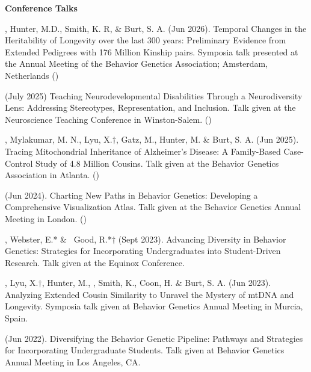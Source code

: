 {\large {\bf Conference Talks}}\begin{etaremune}

\item \meb, Hunter, M.D., Smith, K. R, \& Burt, S. A. (Jun 2026). Temporal Changes in the Heritability of Longevity over the last 300 years: Preliminary Evidence from Extended Pedigrees with 176 Million Kinship pairs. Symposia talk presented at the Annual Meeting of the Behavior Genetics Association; Amsterdam, Netherlands ()

\item \meb (July 2025) Teaching Neurodevelopmental Disabilities Through a Neurodiversity Lens: Addressing Stereotypes, Representation, and Inclusion.  Talk given at the Neuroscience Teaching Conference in Winston-Salem. ()

\item \meb, Mylakumar, M. N., Lyu, X.$\dagger$, Gatz, M., Hunter, M. \& Burt, S. A. (Jun 2025). Tracing Mitochondrial Inheritance of Alzheimer's Disease: A Family-Based Case-Control Study of 4.8 Million Cousins. Talk given at the Behavior Genetics Association in Atlanta. ()

\item \meb (Jun 2024). Charting New Paths in Behavior Genetics: Developing a Comprehensive \R Visualization Atlas. Talk given at the Behavior Genetics Annual Meeting in London. ()

\item \meb, Webster, E.* \& \ Good, R.*$\dagger$ (Sept 2023). Advancing Diversity in Behavior Genetics: Strategies for Incorporating Undergraduates into Student-Driven Research. Talk given at the Equinox Conference.

\item \meb, Lyu, X.$\dagger$, Hunter, M.,  \Joe, Smith, K., Coon, H. \& Burt, S. A. (Jun 2023). Analyzing Extended Cousin Similarity to Unravel the Mystery of mtDNA and Longevity. Symposia talk given at Behavior Genetics Annual Meeting in Murcia, Spain.

\item \meb (Jun 2022). Diversifying the Behavior Genetic Pipeline: Pathways and Strategies for Incorporating Undergraduate Students. Talk given at Behavior Genetics Annual Meeting in Los Angeles, CA.


\end{etaremune}
